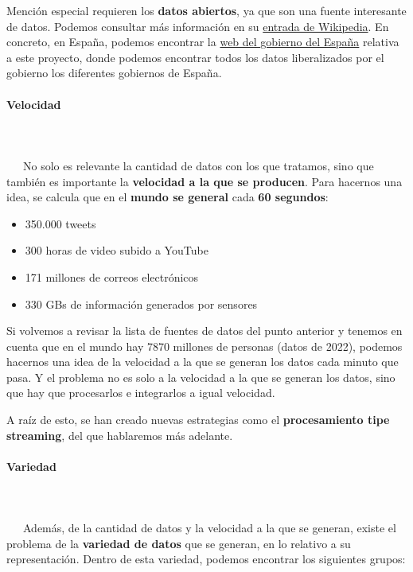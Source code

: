 Mención especial requieren los \textbf{datos abiertos}, ya que son una fuente interesante de datos. Podemos consultar más información en su \href{https://es.wikipedia.org/wiki/Datos_abiertos}{entrada de Wikipedia}. En concreto, en España, podemos encontrar la \href{https://datos.gob.es/es/}{web del gobierno del España} relativa a este proyecto, donde podemos encontrar todos los datos liberalizados por el gobierno los diferentes gobiernos de España.

\paragraph{Velocidad}
~\\\\
\-\ \-\ \-\ No solo es relevante la cantidad de datos con los que tratamos, sino que también es importante la \textbf{velocidad a la que se producen}. Para hacernos una idea, se calcula que en el \textbf{mundo se general} cada \textbf{60 segundos}: 

\begin{itemize}
	\item 350.000 tweets
	\item 300 horas de video subido a YouTube
	\item 171 millones de correos electrónicos
	\item 330 GBs de información generados por sensores
\end{itemize}

Si volvemos a revisar la lista de fuentes de datos del punto anterior y tenemos en cuenta que en el mundo hay 7870 millones de personas (datos de 2022), podemos hacernos una idea de la velocidad a la que se generan los datos cada minuto que pasa. Y el problema no es solo a la velocidad a la que se generan los datos, sino que hay que procesarlos e integrarlos a igual velocidad.

A raíz de esto, se han creado nuevas estrategias como el \textbf{procesamiento tipe streaming}, del que hablaremos más adelante.                                              

\paragraph{Variedad}
~\\\\
\-\ \-\ \-\ Además, de la cantidad de datos y la velocidad a la que se generan, existe el problema de la \textbf{variedad de datos} que se generan, en lo relativo a su representación. Dentro de esta variedad, podemos encontrar los siguientes grupos:

